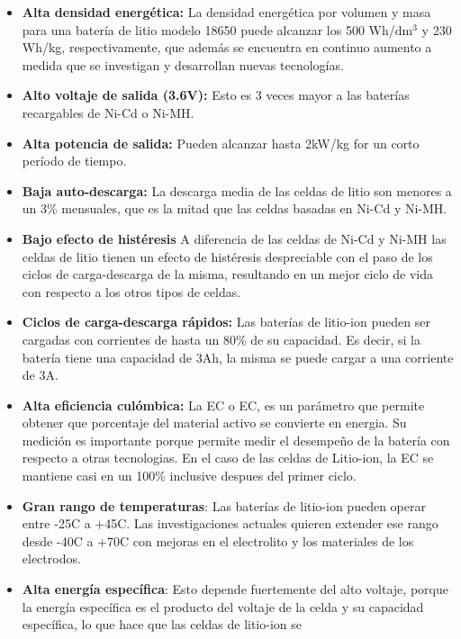 \documentclass[10pt,a4paper]{article}
\begin{document}
\begin{itemize}
    \item \textbf{Alta densidad energética:} La densidad energética por
	volumen y masa para una batería de litio modelo 18650 puede alcanzar
	los 500 Wh/$\mathrm{dm^3}$ y 230 Wh/kg, respectivamente, que adem\'as
	se encuentra en continuo aumento a medida que se investigan y
	desarrollan nuevas tecnologías.
    \item \textbf{Alto voltaje de salida (3.6V):} Esto es 3 veces 
        mayor a las baterías recargables de Ni-Cd o Ni-MH.
    \item \textbf{Alta potencia de salida:} Pueden alcanzar hasta 2kW/kg for
	un corto per\'iodo de tiempo.
    \item \textbf{Baja auto-descarga:} La descarga media de las celdas de
	litio son menores a un 3\% mensuales, que es la mitad que las celdas
	basadas en Ni-Cd y Ni-MH.
    \item \textbf{Bajo efecto de histéresis} A diferencia de las celdas de
	Ni-Cd y Ni-MH las celdas de litio tienen un efecto de histéresis
	despreciable con el paso de los ciclos de carga-descarga de la
	misma, resultando en un mejor ciclo de vida con respecto a los otros
	tipos de celdas.
    \item \textbf{Ciclos de carga-descarga rápidos:} Las baterías de
	litio-ion pueden ser cargadas con corrientes de hasta un 80\% de su
	capacidad. Es decir, si la batería tiene una capacidad de 3Ah, la
	misma se puede cargar a una corriente de 3A.
    \item \textbf{Alta eficiencia cul\'ombica:} La \acrlong{EC} o \acrshort{EC},
	es un par\'ametro que permite obtener que porcentaje del material
	activo se convierte en energia. Su medici\'on es importante porque 
	permite medir el desempeño de la bater\'ia con respecto a otras 
    tecnologias. En el caso de las celdas de Litio-ion, la \acrlong{EC}
	se mantiene casi en un 100\% inclusive despues del primer ciclo.
    \item \textbf{Gran rango de temperaturas}: Las bater\'ias de litio-ion
	pueden operar entre -25\degree C a +45\degree C. Las
	investigaciones actuales quieren extender ese rango desde -40\degree C a 
    +70\degree C con mejoras en el electrolito y los materiales de los 
    electrodos.
    \item \textbf{Alta energ\'ia espec\'ifica}: Esto depende fuertemente del alto 
    voltaje, porque la energía específica es el producto del voltaje de la celda 
    y su capacidad específica, lo que hace que las celdas de litio-ion se 

\end{itemize}
\end{document}
